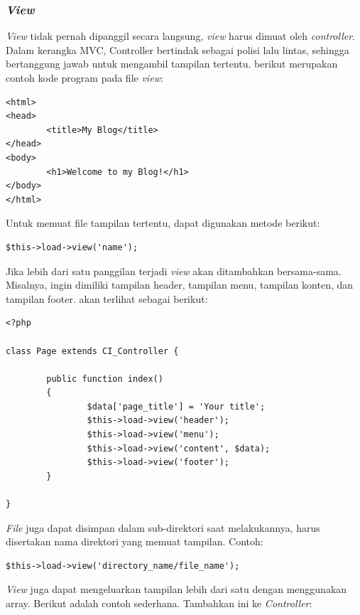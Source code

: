 \subsubsection{\textit{View}}
\label{sec:View} 
\textit{View} tidak pernah dipanggil secara langsung, \textit{view} harus dimuat oleh \textit{controller}. Dalam kerangka MVC, Controller bertindak sebagai polisi lalu lintas, sehingga bertanggung jawab untuk mengambil tampilan tertentu. berikut merupakan contoh kode program pada file \textit{view}: 
    \begin{lstlisting}[basicstyle=\ttfamily, frame=single,
        columns=fullflexible, breaklines=true, numbers=none]
<html>
<head>
        <title>My Blog</title>
</head>
<body>
        <h1>Welcome to my Blog!</h1>
</body>
</html>
    \end{lstlisting}
    Untuk memuat file tampilan tertentu, dapat digunakan metode berikut:
    \begin{lstlisting}[basicstyle=\ttfamily, frame=single,
        columns=fullflexible, breaklines=true, numbers=none]
$this->load->view('name');
    \end{lstlisting}    
    Jika lebih dari satu panggilan terjadi \textit{view} akan ditambahkan bersama-sama. Misalnya, ingin dimiliki tampilan header, tampilan menu, tampilan konten, dan tampilan footer. akan terlihat sebagai berikut:
    \begin{lstlisting}[basicstyle=\ttfamily, frame=single,
        columns=fullflexible, breaklines=true, numbers=none]
<?php

class Page extends CI_Controller {

        public function index()
        {
                $data['page_title'] = 'Your title';
                $this->load->view('header');
                $this->load->view('menu');
                $this->load->view('content', $data);
                $this->load->view('footer');
        }

}
    \end{lstlisting}    
    \textit{File} juga dapat disimpan dalam sub-direktori saat melakukannya, harus disertakan nama direktori yang memuat tampilan. Contoh:
    \begin{lstlisting}[basicstyle=\ttfamily, frame=single,
        columns=fullflexible, breaklines=true, numbers=none]
$this->load->view('directory_name/file_name');
    \end{lstlisting}  
\textit{View} juga dapat mengeluarkan tampilan lebih dari satu dengan menggunakan array. Berikut adalah contoh sederhana. Tambahkan ini ke \textit{Controller}:
